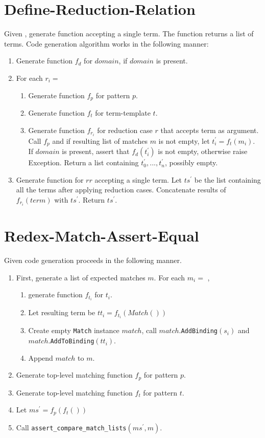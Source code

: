 \section{Define-Reduction-Relation}
Given \DefineReductionRelation, generate function accepting a single term. The function returns a list of terms. Code generation algorithm works in the following manner:

\begin{enumerate}
\item Generate function $f_d$ for $domain$, if $domain$ is present.
\item For each $r_i= $ \ReductionCase
	\begin{enumerate}
	\item Generate function $f_p$ for pattern $p$.
	\item Generate function $f_t$ for term-template $t$.
	\item Generate function $f_{r_i}$ for reduction case $r$ that accepts term as argument. Call $f_p$ and if resulting list of matches $m$ is not empty, let $t_i^\prime=f_t(m_i)$. If $domain$ is present, assert that $f_d(t_i^\prime)$ is not empty, otherwise raise Exception. Return a list containing $t_0^\prime, ..., t_n^\prime$, possibly empty.
	\end{enumerate}
\item Generate function for $rr$ accepting a single term. Let $ts^\prime$ be the list containing all the terms after applying reduction cases. Concatenate results of $f_{r_i}(term)$ with $ts^\prime$. Return $ts^\prime$.
\end{enumerate}

\section{Redex-Match-Assert-Equal}
Given \RedexMatchAssertEqual code generation proceeds in the following manner.

\begin{enumerate}
\item First, generate a list of expected matches $m$. For each $m_i =$ \Match, 
\begin{enumerate}

\item generate function $f_{t_i}$ for $t_i$. 
\item Let resulting term be $tt_i = f_{t_i}(Match())$ 
\item Create empty \texttt{Match} instance $match$, call $match$.\texttt{AddBinding}$(s_i)$ and $match$.\texttt{AddToBinding}$(tt_i)$. 
\item Append $match$ to $m$.
\end{enumerate}
\item Generate top-level matching function $f_p$ for pattern $p$.
\item Generate top-level matching function $f_t$ for pattern $t$.
\item Let $ms^\prime = f_p(f_t())$
\item Call \texttt{assert\_compare\_match\_lists}$(ms^\prime, m)$.
\end{enumerate}

